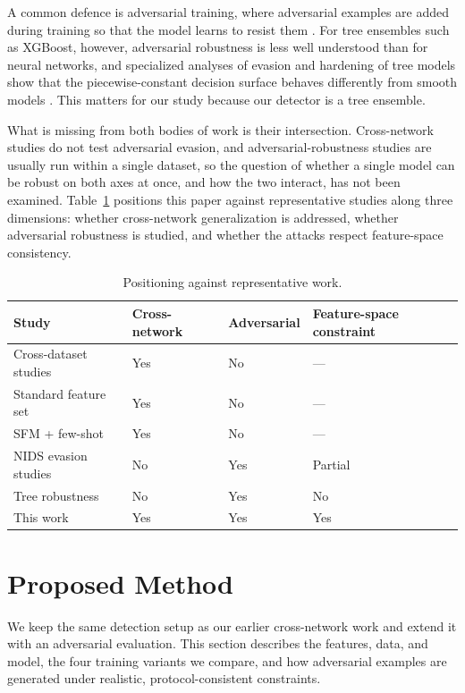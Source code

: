\documentclass[11pt,a4paper]{article}
\begin{document}
A common defence is adversarial training, where adversarial examples are added during
training so that the model learns to resist them \cite{madry2018}. For tree ensembles
such as XGBoost, however, adversarial robustness is less well understood than for neural
networks, and specialized analyses of evasion and hardening of tree models show that the
piecewise-constant decision surface behaves differently from smooth models
\cite{chen2019robusttrees,kantchelian2016}. This matters for our study because our
detector is a tree ensemble.

What is missing from both bodies of work is their intersection. Cross-network studies do
not test adversarial evasion, and adversarial-robustness studies are usually run within a
single dataset, so the question of whether a single model can be robust on both axes at
once, and how the two interact, has not been examined. Table~\ref{tab:p2related}
positions this paper against representative studies along three dimensions: whether
cross-network generalization is addressed, whether adversarial robustness is studied, and
whether the attacks respect feature-space consistency.

\begin{table}[htbp]
\centering
\caption{Positioning against representative work.}
\label{tab:p2related}
\footnotesize
\begin{tabular}{llll}
\toprule
Study & Cross-network & Adversarial & Feature-space constraint \\
\midrule
Cross-dataset studies \cite{dhooge,verkerken,cantone} & Yes & No & --- \\
Standard feature set \cite{sarhan} & Yes & No & --- \\
SFM + few-shot \cite{martono2024sfm} & Yes & No & --- \\
NIDS evasion studies \cite{apruzzese2023,sheatsley2022} & No & Yes & Partial \\
Tree robustness \cite{chen2019robusttrees,kantchelian2016} & No & Yes & No \\
This work & Yes & Yes & Yes \\
\bottomrule
\end{tabular}
\end{table}

\section{Proposed Method}
We keep the same detection setup as our earlier cross-network work and extend it with an
adversarial evaluation. This section describes the features, data, and model, the four
training variants we compare, and how adversarial examples are generated under
realistic, protocol-consistent constraints.
\end{document}
